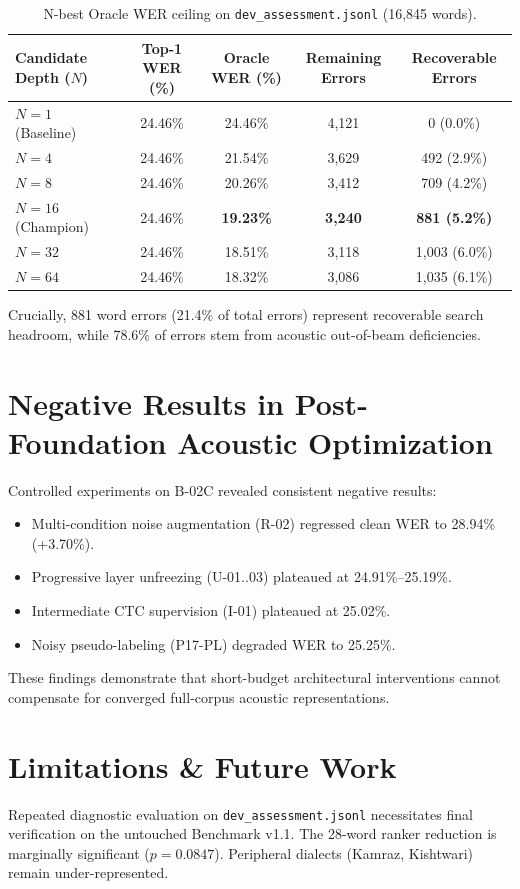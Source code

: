 \documentclass[11pt,a4paper]{article}
\begin{document}
\begin{table}[ht]
\centering
\small
\caption{N-best Oracle WER ceiling on \texttt{dev\_assessment.jsonl} (16,845 words).}
\label{tab:oracle}
\begin{tabular}{lcccc}
\toprule
\textbf{Candidate Depth ($N$)} & \textbf{Top-1 WER (\%)} & \textbf{Oracle WER (\%)} & \textbf{Remaining Errors} & \textbf{Recoverable Errors} \\
\midrule
$N = 1$ (Baseline) & 24.46\% & 24.46\% & 4,121 & 0 (0.0\%) \\
$N = 4$ & 24.46\% & 21.54\% & 3,629 & 492 (2.9\%) \\
$N = 8$ & 24.46\% & 20.26\% & 3,412 & 709 (4.2\%) \\
$N = 16$ (Champion) & 24.46\% & \textbf{19.23\%} & \textbf{3,240} & \textbf{881 (5.2\%)} \\
$N = 32$ & 24.46\% & 18.51\% & 3,118 & 1,003 (6.0\%) \\
$N = 64$ & 24.46\% & 18.32\% & 3,086 & 1,035 (6.1\%) \\
\bottomrule
\end{tabular}
\end{table}

Crucially, 881 word errors (21.4\% of total errors) represent recoverable search headroom, while 78.6\% of errors stem from acoustic out-of-beam deficiencies.

\section{Negative Results in Post-Foundation Acoustic Optimization}
Controlled experiments on B-02C revealed consistent negative results:
\begin{itemize}
    \item Multi-condition noise augmentation (R-02) regressed clean WER to 28.94\% (+3.70\%).
    \item Progressive layer unfreezing (U-01..03) plateaued at 24.91\%--25.19\%.
    \item Intermediate CTC supervision (I-01) plateaued at 25.02\%.
    \item Noisy pseudo-labeling (P17-PL) degraded WER to 25.25\%.
\end{itemize}
These findings demonstrate that short-budget architectural interventions cannot compensate for converged full-corpus acoustic representations.

\section{Limitations \& Future Work}
Repeated diagnostic evaluation on \texttt{dev\_assessment.jsonl} necessitates final verification on the untouched Benchmark v1.1. The 28-word ranker reduction is marginally significant ($p = 0.0847$). Peripheral dialects (Kamraz, Kishtwari) remain under-represented.
\end{document}
